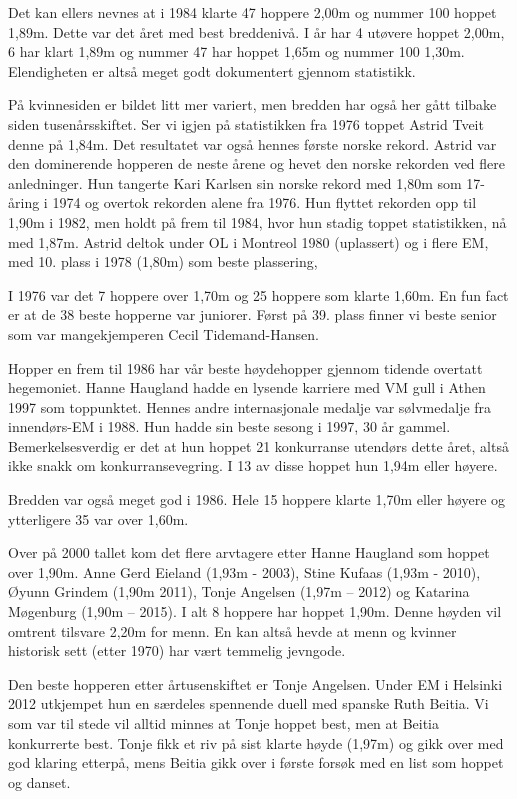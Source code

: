 Det kan ellers nevnes at i 1984 klarte 47 hoppere 2,00m og nummer 100 hoppet 1,89m. Dette var det året med best breddenivå. I år har 4 utøvere hoppet 2,00m, 6 har klart 1,89m og nummer 47 har hoppet 1,65m og nummer 100 1,30m. Elendigheten er altså meget godt dokumentert gjennom statistikk.

På kvinnesiden er bildet litt mer variert, men bredden har også her gått tilbake siden tusenårsskiftet. Ser vi igjen på statistikken fra 1976 toppet Astrid Tveit denne på 1,84m. Det resultatet var også hennes første norske rekord. Astrid var den dominerende hopperen de neste årene og hevet den norske rekorden ved flere anledninger. Hun tangerte Kari Karlsen sin norske rekord med 1,80m som 17-åring i 1974 og overtok rekorden alene fra 1976. Hun flyttet rekorden opp til 1,90m i 1982, men holdt på frem til 1984, hvor hun stadig toppet statistikken, nå med 1,87m. Astrid deltok under OL i Montreol 1980 (uplassert) og i flere EM, med 10. plass i 1978 (1,80m) som beste plassering,

I 1976 var det 7 hoppere over 1,70m og 25 hoppere som klarte 1,60m. En fun fact er at de 38 beste hopperne var juniorer. Først på 39. plass finner vi beste senior som var mangekjemperen Cecil Tidemand-Hansen.

Hopper en frem til 1986 har vår beste høydehopper gjennom tidende overtatt hegemoniet. Hanne Haugland hadde en lysende karriere med VM gull i Athen 1997 som toppunktet. Hennes andre internasjonale medalje var sølvmedalje fra innendørs-EM i 1988. Hun hadde sin beste sesong i 1997, 30 år gammel. Bemerkelsesverdig er det at hun hoppet 21 konkurranse utendørs dette året, altså ikke snakk om konkurransevegring. I 13 av disse hoppet hun 1,94m eller høyere.

Bredden var også meget god i 1986. Hele 15 hoppere klarte 1,70m eller høyere og ytterligere 35 var over 1,60m.

Over på 2000 tallet kom det flere arvtagere etter Hanne Haugland som hoppet over 1,90m. Anne Gerd Eieland (1,93m - 2003), Stine Kufaas (1,93m - 2010), Øyunn Grindem (1,90m 2011), Tonje Angelsen (1,97m -- 2012) og Katarina Møgenburg (1,90m -- 2015). I alt 8 hoppere har hoppet 1,90m. Denne høyden vil omtrent tilsvare 2,20m for menn. En kan altså hevde at menn og kvinner historisk sett (etter 1970) har vært temmelig jevngode.

Den beste hopperen etter årtusenskiftet er Tonje Angelsen. Under EM i Helsinki 2012 utkjempet hun en særdeles spennende duell med spanske Ruth Beitia. Vi som var til stede vil alltid minnes at Tonje hoppet best, men at Beitia konkurrerte best. Tonje fikk et riv på sist klarte høyde (1,97m) og gikk over med god klaring etterpå, mens Beitia gikk over i første forsøk med en list som hoppet og danset.

